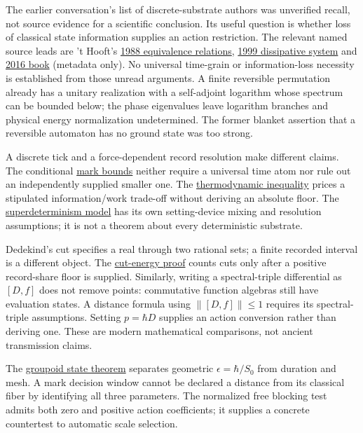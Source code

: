 \documentclass[11pt,a4paper]{article}
\begin{document}
The earlier conversation's list of discrete-substrate authors was
unverified recall, not source evidence for a scientific conclusion. Its
useful question is whether loss of classical state information supplies
an action restriction. The relevant named source leads are 't Hooft's
\href{https://doi.org/10.1007/BF01011560}{1988 equivalence relations},
\href{https://doi.org/10.1088/0264-9381/16/10/316}{1999 dissipative
system} and \href{https://doi.org/10.1007/978-3-319-41285-6}{2016 book}
(metadata only). No universal time-grain or information-loss necessity
is established from those unread arguments. A finite reversible
permutation already has a unitary realization with a self-adjoint
logarithm whose spectrum can be bounded below; the phase eigenvalues
leave logarithm branches and physical energy normalization undetermined.
The former blanket assertion that a reversible automaton has no ground
state was too strong.

A discrete tick and a force-dependent record resolution make different
claims. The conditional \href{mark-cost-and-statistical-floor.md}{mark
bounds} neither require a universal time atom nor rule out an
independently supplied smaller one. The
\href{necessity-unit-and-indeterminacy.md\#thermodynamic-information-costs-an-inequality-not-an-optimum}{thermodynamic
inequality} prices a stipulated information/work trade-off without
deriving an absolute floor. The
\href{superdeterminism-floor.md}{superdeterminism model} has its own
setting-device mixing and resolution assumptions; it is not a theorem
about every deterministic substrate.

Dedekind's cut specifies a real through two rational sets; a finite
recorded interval is a different object. The
\href{cut-measure-newton.md}{cut-energy proof} counts cuts only after a
positive record-share floor is supplied. Similarly, writing a
spectral-triple differential as \([D,f]\) does not remove points:
commutative function algebras still have evaluation states. A distance
formula using \(\|[D,f]\|\le1\) requires its spectral-triple
assumptions. Setting \(p=\hbar D\) supplies an action conversion rather
than deriving one. These are modern mathematical comparisons, not
ancient transmission claims.

The \href{groupoid-quantum-newton-states.md}{groupoid state theorem}
separates geometric \(\epsilon=\hbar/S_0\) from duration and mesh. A
mark decision window cannot be declared a distance from its classical
fiber by identifying all three parameters. The normalized free blocking
test admits both zero and positive action coefficients; it supplies a
concrete countertest to automatic scale selection.
\end{document}
